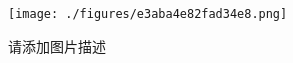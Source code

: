 
\begin{figure}[ht]
\centering
\texttt{[image: ./figures/e3aba4e82fad34e8.png]}
\caption{请添加图片描述} \label{fig_test3_2}
\end{figure}